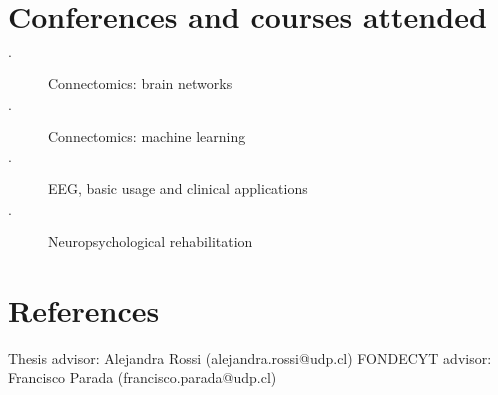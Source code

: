 \documentclass{article}
\begin{document}
\section{Conferences and courses attended}
\begin{description}
    \item[$\cdot$] Connectomics: brain networks
    \item[$\cdot$] Connectomics: machine learning
    \item[$\cdot$] EEG, basic usage and clinical applications
    \item[$\cdot$] Neuropsychological rehabilitation
\end{description}

\section{References}

Thesis advisor: Alejandra Rossi (alejandra.rossi@udp.cl)
FONDECYT advisor: Francisco Parada (francisco.parada@udp.cl)
\end{document}
